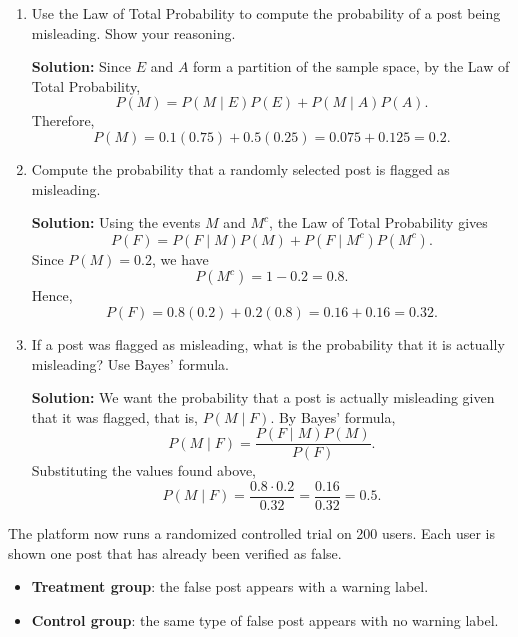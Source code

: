 \documentclass[11pt]{exam}
\begin{document}
\begin{questions}
\begin{enumerate}[leftmargin = 0.5cm, label = (\alph*), rightmargin = 0.2cm]
    \item Use the Law of Total Probability to compute the probability of a post being misleading. Show your reasoning.

    \begin{solutionorbox}[6.5cm]
    \textbf{Solution:} Since $E$ and $A$ form a partition of the sample space, by the Law of Total Probability,
    \[
    P(M)=P(M\mid E)P(E)+P(M\mid A)P(A).
    \]
    Therefore,
    \[
    P(M)=0.1(0.75)+0.5(0.25)=0.075+0.125=0.2.
    \]
    \end{solutionorbox}

    \item Compute the probability that a randomly selected post is flagged as misleading.

    \begin{solutionorbox}[6.5cm]
    \textbf{Solution:} Using the events $M$ and $M^c$, the Law of Total Probability gives
    \[
    P(F)=P(F\mid M)P(M)+P(F\mid M^c)P(M^c).
    \]
    Since $P(M)=0.2$, we have
    \[
    P(M^c)=1-0.2=0.8.
    \]
    Hence,
    \[
    P(F)=0.8(0.2)+0.2(0.8)=0.16+0.16=0.32.
    \]
    \end{solutionorbox}

    \item If a post was flagged as misleading, what is the probability that it is actually misleading? Use Bayes' formula.

    \begin{solutionorbox}[6.5cm]
    \textbf{Solution:} We want the probability that a post is actually misleading given that it was flagged, that is, $P(M\mid F)$.
    By Bayes' formula,
    \[
    P(M\mid F)=\frac{P(F\mid M)P(M)}{P(F)}.
    \]
    Substituting the values found above,
    \[
    P(M\mid F)=\frac{0.8\cdot 0.2}{0.32}=\frac{0.16}{0.32}=0.5.
    \]
    \end{solutionorbox}
\end{enumerate}

\newpage
\question[4]
The platform now runs a randomized controlled trial on 200 users. Each user is shown one post that has already been verified as false.

\begin{itemize}[leftmargin = 0.6cm]
    \item \textbf{Treatment group}: the false post appears with a warning label.
    \item \textbf{Control group}: the same type of false post appears with no warning label.
\end{itemize}


\end{questions}
\end{document}
